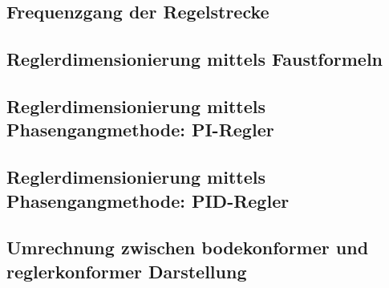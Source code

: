 \clearpage
\subsection{Frequenzgang der Regelstrecke}
\label{subs:frequenzgang}


\subsection{Reglerdimensionierung mittels Faustformeln}
\label{subs:faustformeln}


\subsection{Reglerdimensionierung mittels Phasengangmethode: PI-Regler}
\label{subs:phasengang:pi}


\subsection{Reglerdimensionierung mittels Phasengangmethode: PID-Regler}
\label{subs:phasengang:pid}


\subsection{Umrechnung zwischen bodekonformer und reglerkonformer Darstellung}
\label{subs:bode_regler}

